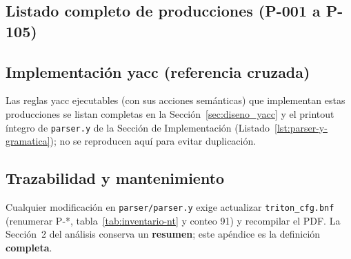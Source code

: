 \subsection{Listado completo de producciones (P-001 a P-105)}


\subsection{Implementación yacc (referencia cruzada)}
Las reglas yacc ejecutables (con sus acciones semánticas) que implementan estas
producciones se listan completas en la Sección~\ref{sec:diseno_yacc} y el
printout íntegro de \texttt{parser.y} de la Sección de Implementación
(Listado~\ref{lst:parser-y-gramatica}); no se reproducen aquí para evitar
duplicación.

\subsection{Trazabilidad y mantenimiento}
Cualquier modificación en \texttt{parser/parser.y} exige actualizar \texttt{triton\_cfg.bnf} (renumerar P-*, tabla~\ref{tab:inventario-nt} y conteo 91) y recompilar el PDF. La Sección~2 del análisis conserva un \textbf{resumen}; este apéndice es la definición \textbf{completa}.
